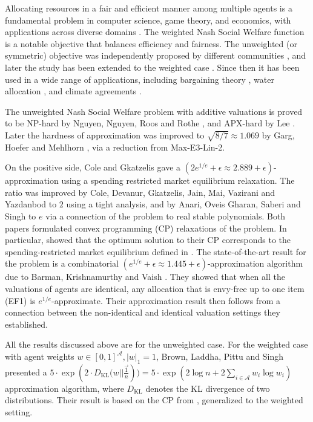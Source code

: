 \documentclass{theoretics}
\newcommand\calA{{\mathcal{A}}}
\begin{document}
Allocating resources in a fair and efficient manner among multiple agents is a fundamental problem in computer science, game theory, and economics, with applications across diverse domains \cite{KN79, You94, BT96, RW98, Mou04, BT05,  Rot15, BCE16}. The weighted Nash Social Welfare function is a notable objective that balances efficiency and fairness. The unweighted (or symmetric) objective was independently proposed by different communities \cite{Nas50, Kel97, Var74}, and later the study has been extended to the weighted case \cite{HS72, Kal77}. Since then it has been used in a wide range of applications, including bargaining theory \cite{LV07, CM10, Tho86}, water allocation \cite{HLZ13, DHY18}, and climate agreements \cite{YvIW17}.

The unweighted Nash Social Welfare problem with additive valuations is proved to be NP-hard by Nguyen, Nguyen, Roos and Rothe \cite{NNRR12}, and APX-hard by Lee \cite{Lee15}.  Later the hardness of approximation was improved to $\sqrt{8/7} \approx 1.069$ by Garg, Hoefer and Mehlhorn \cite{GHM23}, via a reduction from Max-E3-Lin-2.

On the positive side, Cole and Gkatzelis \cite{CG15} gave a $(2e^{1/e} + \epsilon\approx 2.889 + \epsilon)$-approximation using a spending restricted market equilibrium relaxation. The ratio was improved by Cole, Devanur, Gkatzelis, Jain, Mai, Vazirani and Yazdanbod \cite{CDG17} to $2$ using a tight analysis, and by Anari, Oveis Gharan, Saberi and Singh \cite{AGS17} to $e$ via a connection of the problem to real stable polynomials. Both papers formulated convex programming (CP) relaxations of the problem. In particular, \cite{CDG17} showed that the optimum solution to their CP corresponds to the spending-restricted market equilibrium defined in \cite{CG15}.  The state-of-the-art result for the problem is a combinatorial $(e^{1/e}+\epsilon\approx 1.445 + \epsilon)$-approximation algorithm due to Barman, Krishnamurthy and Vaish \cite{BKV18}. They showed that when all the valuations of agents are identical, any allocation that is envy-free up to one item (EF1) is $e^{1/e}$-approximate.  Their approximation result then follows from a connection between the non-identical and identical valuation settings they established. 

All the results discussed above are for the unweighted case.  For the weighted case with agent weights $w \in [0, 1]^\calA, |w|_1 = 1$, Brown, Laddha, Pittu and Singh \cite{BLP24} presented a $5 \cdot \exp(2 \cdot D_{\text{KL}}\Big(w || \frac{\vec{1}}{n})\Big) = 5\cdot \exp(2\log n + 2\sum_{i \in \calA} w_i \log w_i)$ approximation algorithm, where $D_{\text{KL}}$ denotes the KL divergence of two distributions. Their result is based on the CP from \cite{CDG17}, generalized to the weighted setting. 
\smallskip
\end{document}
